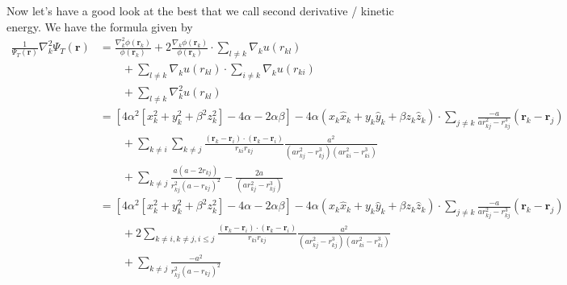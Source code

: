 \documentclass[%
oneside,                 %
final,                   %
10pt]{article}
\begin{document}
Now let's have a good look at the best that we call second derivative / kinetic energy. 
We have the formula given by
\begin{align*}
\frac{1}{\Psi_T(\mathbf{r})}\nabla_k^2\Psi_T(\mathbf{r}) &=
   \frac{\nabla_k^2\phi(\mathbf{r}_k)}{\phi(\mathbf{r}_k)}
   + 2\frac{\nabla_k\phi(\mathbf{r}_k)}{\phi(\mathbf{r}_k)}\cdot 
   \sum_{l\ne k}\nabla_k u(r_{kl})
   \\
   &\qquad
   + \sum_{l\ne k}\nabla_k u(r_{kl}) \cdot \sum_{i\ne k}\nabla_k u(r_{ki})
   \\
   &\qquad
   + \sum_{l\ne k}\nabla_k^2 u(r_{kl})
   \\
   &=\left[ 4\alpha^2\left[x_k^2+y_k^2+\beta^2z_k^2\right]-4\alpha-2\alpha\beta\right]-4\alpha(x_k \hat{x}_k+y_k \hat{y}_k+\beta z_k \hat{z}_k)\cdot \sum_{j\ne k}\frac{-a}{ar^2_{kj}-r^3_{kj}}{(\mathbf{r}_k-\mathbf{r}_j)}
   \\
   &\qquad + \sum_{k \ne i}\sum_{k \ne j}\frac{(\mathbf{r}_k-\mathbf{r}_i)\cdot(\mathbf{r}_k-\mathbf{r}_i)}{r_{ki}r_{kj}}\frac{a^2}{(ar^2_{kj}-r^3_{kj})(ar^2_{ki}-r^3_{ki})}
   \\
   &\qquad + \sum_{k \ne j}\frac{a(a-2r_{kj})}{r_{kj}^2(a-r_{kj})^2}-\frac{2a}{(ar^2_{kj}-r^3_{kj})}\\
   &=\left[ 4\alpha^2\left[x_k^2+y_k^2+\beta^2z_k^2\right]-4\alpha-2\alpha\beta\right]-4\alpha(x_k \hat{x}_k+y_k \hat{y}_k+\beta z_k \hat{z}_k)\cdot \sum_{j\ne k}\frac{-a}{ar^2_{kj}-r^3_{kj}}{(\mathbf{r}_k-\mathbf{r}_j)}
   \\
   &\qquad + 2\sum_{k \ne i,k \ne j, i\leq j} \frac{(\mathbf{r}_k-\mathbf{r}_i)\cdot(\mathbf{r}_k-\mathbf{r}_i)}{r_{ki}r_{kj}}\frac{a^2}{(ar^2_{kj}-r^3_{kj})(ar^2_{ki}-r^3_{ki})}
   \\
   &\qquad + \sum_{k \ne j}\frac{-a^2}{r_{kj}^2(a-r_{kj})^2}
\end{align*}
 
\end{document}
